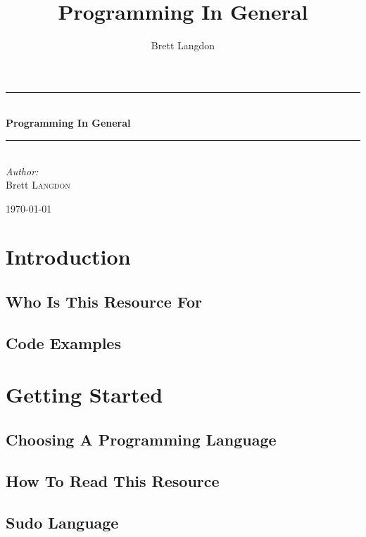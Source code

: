 \documentclass[10pt,a4paper,titlepage]{book}
\author{Brett Langdon}
\title{Programming In General}
\newcommand{\HRule}{\rule{\linewidth}{0.5mm}}
\begin{document}
\begin{titlepage}
\begin{center}

\vspace*{3 in}

\HRule \\[0.4cm]
{\huge \bfseries Programming In General}
\HRule \\[0.4cm]

\emph{Author:}\\
Brett \textsc{Langdon}

\vfill

{\large \today}

\end{center}
\end{titlepage}

\tableofcontents

\chapter{Introduction}

\vfill
\pagebreak
\section{Who Is This Resource For}

\vfill
\pagebreak
\section{Code Examples}

\vfill
\pagebreak
\chapter{Getting Started}

\vfill
\pagebreak
\section{Choosing A Programming Language}

\vfill
\pagebreak
\section{How To Read This Resource}

\vfill
\pagebreak
\section{Sudo Language}

\vfill
\pagebreak
\end{document}
